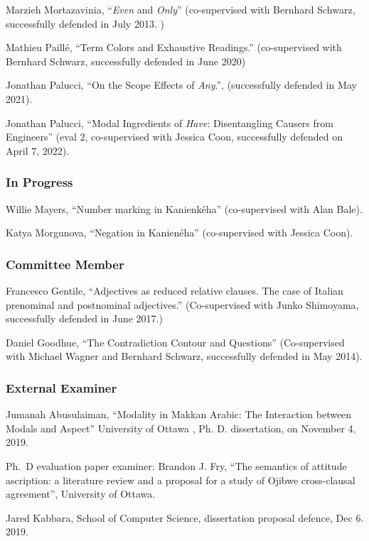 \documentclass[11pt]{article}
\begin{document}
Marzieh Mortazavinia, ``\textit{Even} and \textit{Only}''
(co-supervised with Bernhard Schwarz, successfully defended in July
2013. )

Mathieu Paill\'e, ``Term Colors and Exhaustive Readings.'' (co-supervised with Bernhard Schwarz, successfully defended in June 2020)

Jonathan Palucci, ``On the Scope Effects of \textit{Any}.'', (successfully defended in May 2021).

Jonathan Palucci, ``Modal Ingredients of \textit{Have}: Disentangling Causers from Engineers'' (eval 2, co-supervised with Jessica Coon, successfully defended on April 7, 2022).


\subsubsection*{In Progress}


Willie Mayers, ``Number marking in Kanienk\'eha''  (co-supervised with Alan Bale).

Katya Morgunova, ``Negation in Kanien\'eha'' (co-supervised with Jessica Coon).


\subsubsection*{Committee Member}


Francesco Gentile,  ``Adjectives as reduced relative clauses. The case of Italian prenominal and postnominal adjectives.'' (Co-supervised with Junko Shimoyama, successfully defended in June 2017.)

Daniel Goodhue, ``The Contradiction Contour and Questions''
(Co-supervised with Michael Wagner and Bernhard Schwarz, successfully
defended in May 2014).

\subsubsection*{External Examiner}

Jumanah Abusulaiman, “Modality in Makkan Arabic: The Interaction between Modals and Aspect” University of Ottawa , Ph. D. dissertation, on November 4, 2019.

Ph.\ D evaluation paper examiner: Brandon J. Fry, ``The semantics of attitude ascription: a literature review and a proposal for a study of Ojibwe cross-clausal agreement'', University of Ottawa.

Jared Kabbara, School of Computer Science, dissertation proposal defence, Dec 6. 2019.
\end{document}
